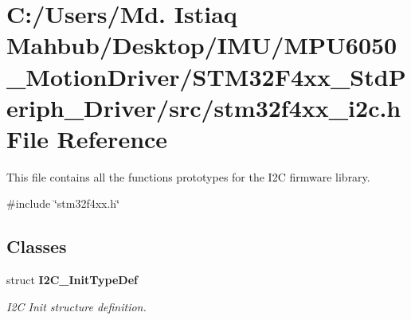 \section{C\+:/\+Users/\+Md. Istiaq Mahbub/\+Desktop/\+I\+M\+U/\+M\+P\+U6050\+\_\+\+Motion\+Driver/\+S\+T\+M32\+F4xx\+\_\+\+Std\+Periph\+\_\+\+Driver/src/stm32f4xx\+\_\+i2c.h File Reference}
\label{stm32f4xx__i2c_8h}


This file contains all the functions prototypes for the I2C firmware library.  


{\ttfamily \#include \char`\"{}stm32f4xx.\+h\char`\"{}}\newline
\subsection*{Classes}
\begin{DoxyCompactItemize}
\item 
struct \textbf{ I2\+C\+\_\+\+Init\+Type\+Def}
\begin{DoxyCompactList}\small\item\em I2C Init structure definition. \end{DoxyCompactList}\end{DoxyCompactItemize}
